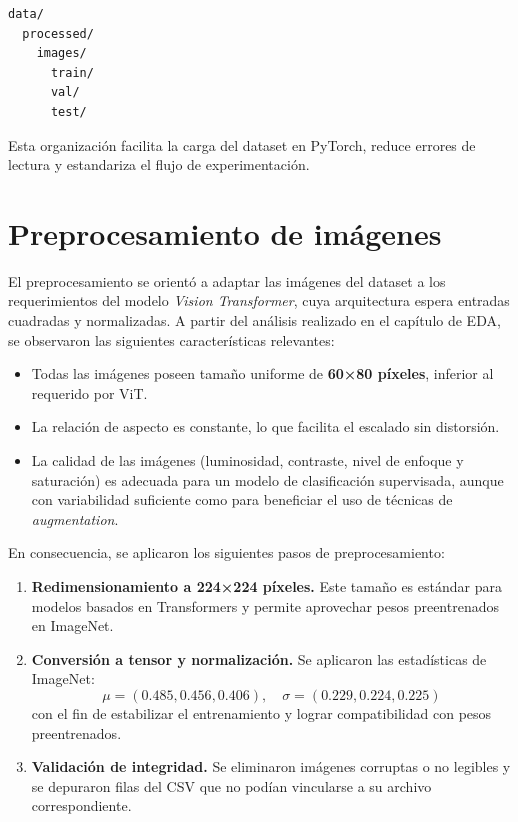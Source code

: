 \begin{verbatim}
data/
  processed/
    images/
      train/
      val/
      test/
\end{verbatim}

Esta organización facilita la carga del dataset en PyTorch, reduce errores de lectura y estandariza el flujo de experimentación.

\section{Preprocesamiento de imágenes}

El preprocesamiento se orientó a adaptar las imágenes del dataset a los requerimientos del modelo \textit{Vision Transformer}, cuya arquitectura espera entradas cuadradas y normalizadas. A partir del análisis realizado en el capítulo de EDA, se observaron las siguientes características relevantes:

\begin{itemize}
    \item Todas las imágenes poseen tamaño uniforme de \textbf{60×80 píxeles}, inferior al requerido por ViT.
    \item La relación de aspecto es constante, lo que facilita el escalado sin distorsión.
    \item La calidad de las imágenes (luminosidad, contraste, nivel de enfoque y saturación) es adecuada para un modelo de clasificación supervisada, aunque con variabilidad suficiente como para beneficiar el uso de técnicas de \textit{augmentation}.
\end{itemize}

En consecuencia, se aplicaron los siguientes pasos de preprocesamiento:

\begin{enumerate}
    \item \textbf{Redimensionamiento a 224×224 píxeles.}  
    Este tamaño es estándar para modelos basados en Transformers y permite aprovechar pesos preentrenados en ImageNet.

    \item \textbf{Conversión a tensor y normalización.}  
    Se aplicaron las estadísticas de ImageNet:
    \[
        \mu = (0.485, 0.456, 0.406), \quad
        \sigma = (0.229, 0.224, 0.225)
    \]
    con el fin de estabilizar el entrenamiento y lograr compatibilidad con pesos preentrenados.

    \item \textbf{Validación de integridad.}  
    Se eliminaron imágenes corruptas o no legibles y se depuraron filas del CSV que no podían vincularse a su archivo correspondiente.
\end{enumerate}


